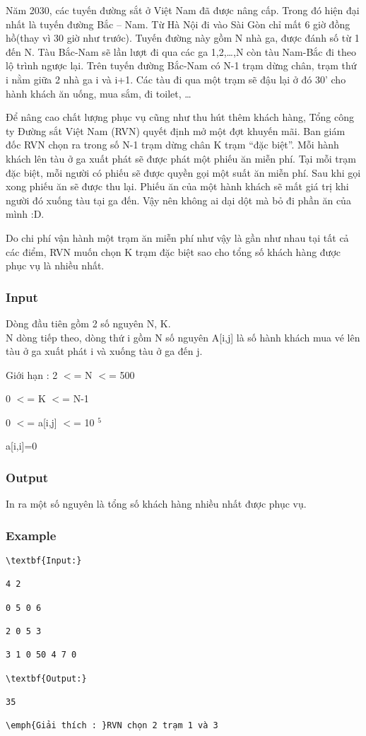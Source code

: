 



   Năm 2030, các tuyến đường sắt ở Việt Nam đã được nâng cấp. Trong đó hiện đại nhất là tuyến đường Bắc – Nam. Từ Hà Nội đi vào Sài Gòn chỉ mất 6 giờ đồng hồ(thay vì 30 giờ như trước). Tuyến đường này gồm N nhà ga, được đánh số từ 1 đến N. Tàu Bắc-Nam sẽ lần lượt đi qua các ga 1,2,…,N còn tàu Nam-Bắc đi theo lộ trình ngược lại. Trên tuyến đường Bắc-Nam có N-1 trạm dừng chân, trạm thứ i nằm giữa 2 nhà ga i và i+1. Các tàu đi qua một trạm sẽ đậu lại ở đó 30’ cho hành khách ăn uống, mua sắm, đi toilet, …  

   Để nâng cao chất lượng phục vụ cũng như thu hút thêm khách hàng, Tổng công ty Đường sắt Việt Nam (RVN) quyết định mở một đợt khuyến mãi. Ban giám đốc RVN chọn ra trong số N-1 trạm dừng chân K trạm “đặc biệt”. Mỗi hành khách lên tàu ở ga xuất phát sẽ được phát một phiếu ăn miễn phí. Tại mỗi trạm đặc biệt, mỗi người có phiếu sẽ được quyền gọi một suất ăn miễn phí. Sau khi gọi xong phiếu ăn sẽ được thu lại. Phiếu ăn của một hành khách sẽ mất giá trị khi người đó xuống tàu tại ga đến. Vậy nên không ai dại dột mà bỏ đi phần ăn của mình :D.  

   Do chi phí vận hành một trạm ăn miễn phí như vậy là gần như nhau tại tất cả các điểm, RVN muốn chọn K trạm đặc biệt sao cho tổng số khách hàng được phục vụ là nhiều nhất.  

\subsubsection{   Input  }

   Dòng đầu tiên gồm 2 số nguyên N, K.   
\\   N dòng tiếp theo, dòng thứ i gồm N số nguyên A[i,j] là số hành khách mua vé lên tàu ở ga xuất phát i và xuống tàu ở ga đến j.  

\emph{}    Giới hạn :      2 $<$= N $<$= 500  

   0 $<$= K $<$= N-1  

   0 $<$= a[i,j] $<$= 10   $^    5   $

   a[i,i]=0  

\subsubsection{   Output  }

   In ra một số nguyên là tổng số khách hàng nhiều nhất được phục vụ.  

\subsubsection{   Example  }
\begin{verbatim}
\textbf{Input:}

4 2

0 5 0 6

2 0 5 3

3 1 0 50 4 7 0

\textbf{Output:}

35

\emph{Giải thích : }RVN chọn 2 trạm 1 và 3\end{verbatim}